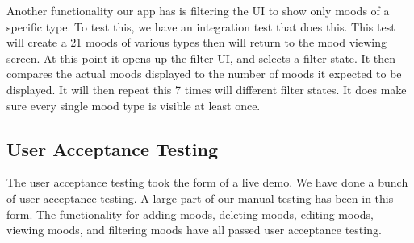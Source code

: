 Another functionality our app has is filtering the UI to show only moods of a
specific type. To test this, we have an integration test that does this. This
test will create a 21 moods of various types then will return to the mood
viewing screen. At this point it opens up the filter UI, and selects a filter
state. It then compares the actual moods displayed to the number of moods it
expected to be displayed. It will then repeat this 7 times will different
filter states. It does make sure every single mood type is visible at least
once.


\subsection{User Acceptance Testing}

The user acceptance testing took the form of a live demo.
We have done a bunch of user acceptance testing. A large part of our manual
testing has been in this form. The functionality for adding moods, deleting
moods, editing moods, viewing moods, and filtering moods have all passed user
acceptance testing. 



